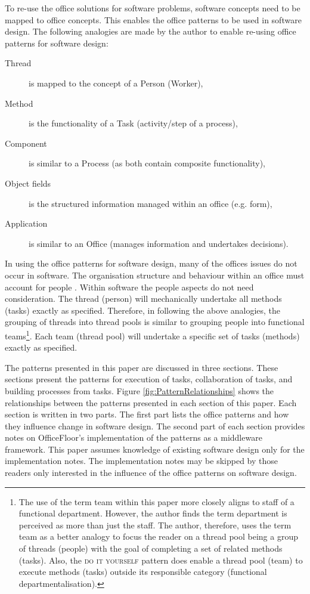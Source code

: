 \documentclass[prodmode]{style/acmlarge}
\begin{document}
To re-use the office solutions for software problems, software concepts need to
be mapped to office concepts.  This enables the office patterns to be used in
software design.  The following analogies are made by the author to enable
re-using office patterns for software design:
\begin{description}
  \item[Thread] is mapped to the concept of a Person (Worker),
  \item[Method] is the functionality of a Task (activity/step of a process),
  \item[Component] is similar to a Process (as both contain composite functionality),
  \item[Object fields] is the structured information managed within an office (e.g. form),
  \item[Application] is similar to an Office (manages information and undertakes decisions).
\end{description}

In using the office patterns for software design, many of the offices issues do
not occur in software.  The organisation structure and behaviour within an
office must account for people \cite{organisational-behaviour}.  Within software
the people aspects do not need consideration.  The thread (person) will
mechanically undertake all methods (tasks) exactly as specified.  Therefore, in
following the above analogies, the grouping of threads into thread pools is
similar to grouping people into functional teams\footnote{The use of the term
team within this paper more closely aligns to staff of a functional department.
However, the author finds the term department is perceived as more than just the
staff.  The author, therefore, uses the term team as a better analogy to focus
the reader on a thread pool being a group of threads (people) with the goal of
completing a set of related methods (tasks).  Also, the \textsc{do it yourself}
pattern does enable a thread pool (team) to execute methods (tasks) outside its
responsible category (functional departmentalisation).}.  Each team (thread
pool) will undertake a specific set of tasks (methods) exactly as specified.

The patterns presented in this paper are discussed in three sections.  These
sections present the patterns for execution of tasks, collaboration
of tasks, and building processes from tasks.  Figure
\ref{fig:PatternRelationships} shows the relationships between the patterns
presented in each section of this paper.  Each section is written in two parts.
The first part lists the office patterns and how they influence change in
software design.  The second part of each section provides notes on
OfficeFloor's implementation of the patterns as a middleware framework.  This
paper assumes knowledge of existing software design only for the implementation
notes.  The implementation notes may be skipped by those readers only interested
in the influence of the office patterns on software design.
\end{document}
